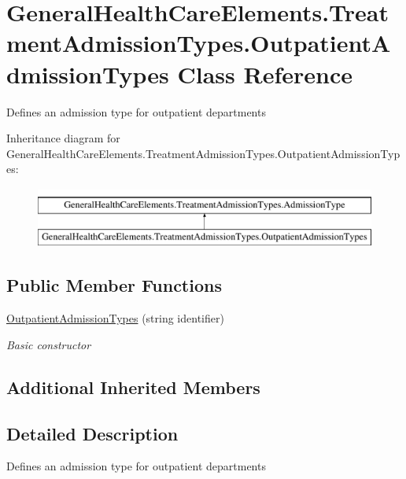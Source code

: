 \hypertarget{class_general_health_care_elements_1_1_treatment_admission_types_1_1_outpatient_admission_types}{}\section{General\+Health\+Care\+Elements.\+Treatment\+Admission\+Types.\+Outpatient\+Admission\+Types Class Reference}
\label{class_general_health_care_elements_1_1_treatment_admission_types_1_1_outpatient_admission_types}


Defines an admission type for outpatient departments  


Inheritance diagram for General\+Health\+Care\+Elements.\+Treatment\+Admission\+Types.\+Outpatient\+Admission\+Types\+:\begin{figure}[H]
\begin{center}
\leavevmode
\includegraphics[height=2.000000cm]{class_general_health_care_elements_1_1_treatment_admission_types_1_1_outpatient_admission_types}
\end{center}
\end{figure}
\subsection*{Public Member Functions}
\begin{DoxyCompactItemize}
\item 
\hyperlink{class_general_health_care_elements_1_1_treatment_admission_types_1_1_outpatient_admission_types_a4b7f8fbca0d4dd46c126cb3e0b94fd81}{Outpatient\+Admission\+Types} (string identifier)
\begin{DoxyCompactList}\small\item\em Basic constructor \end{DoxyCompactList}\end{DoxyCompactItemize}
\subsection*{Additional Inherited Members}


\subsection{Detailed Description}
Defines an admission type for outpatient departments 



